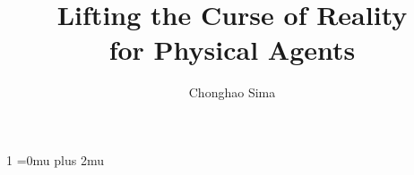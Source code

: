 \documentclass[a4paper,12pt,default,numbered,print]{Classes_final/PhDThesisPSnPDF}
\title{Lifting the Curse of Reality \\ for Physical Agents}
\author{Chonghao Sima}
\begin{document}
\frontmatter



\begin{titlepage}
\maketitle
\end{titlepage}





\tableofcontents
\listoffigures
\listoftables

\mainmatter








\appendix


\backmatter

\begin{spacing}{1}
\small
\Urlmuskip=0mu plus 2mu\relax
\setlength{\bibsep}{2pt plus 0.5pt}

\cleardoublepage

\end{spacing}

\printthesisindex
\end{document}
